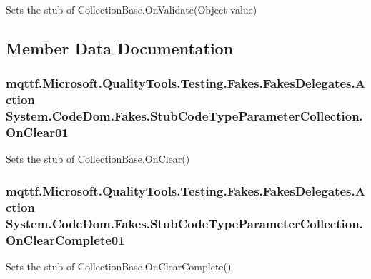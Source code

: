 Sets the stub of Collection\-Base.\-On\-Validate(\-Object value)



\subsection{Member Data Documentation}
\hypertarget{class_system_1_1_code_dom_1_1_fakes_1_1_stub_code_type_parameter_collection_a58acdc2e19544007bbba7763f88113df}{
\subsubsection[{On\-Clear01}]{\setlength{\rightskip}{0pt plus 5cm}mqttf.\-Microsoft.\-Quality\-Tools.\-Testing.\-Fakes.\-Fakes\-Delegates.\-Action System.\-Code\-Dom.\-Fakes.\-Stub\-Code\-Type\-Parameter\-Collection.\-On\-Clear01}}\label{class_system_1_1_code_dom_1_1_fakes_1_1_stub_code_type_parameter_collection_a58acdc2e19544007bbba7763f88113df}


Sets the stub of Collection\-Base.\-On\-Clear()

\hypertarget{class_system_1_1_code_dom_1_1_fakes_1_1_stub_code_type_parameter_collection_a11fa291b5a9b1aadd266cc090ff980af}{
\subsubsection[{On\-Clear\-Complete01}]{\setlength{\rightskip}{0pt plus 5cm}mqttf.\-Microsoft.\-Quality\-Tools.\-Testing.\-Fakes.\-Fakes\-Delegates.\-Action System.\-Code\-Dom.\-Fakes.\-Stub\-Code\-Type\-Parameter\-Collection.\-On\-Clear\-Complete01}}\label{class_system_1_1_code_dom_1_1_fakes_1_1_stub_code_type_parameter_collection_a11fa291b5a9b1aadd266cc090ff980af}


Sets the stub of Collection\-Base.\-On\-Clear\-Complete()

